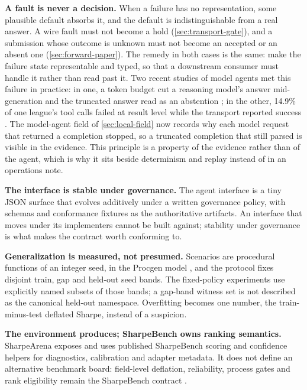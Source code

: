 \textbf{A fault is never a decision.} When a failure has no representation, some plausible default absorbs it, and the default is indistinguishable from a real answer. A wire fault must not become a hold (\cref{sec:transport-gate}), and a submission whose outcome is unknown must not become an accepted or an absent one (\cref{sec:forward-paper}). The remedy in both cases is the same: make the failure state representable and typed, so that a downstream consumer must handle it rather than read past it. Two recent studies of model agents met this failure in practice: in one, a token budget cut a reasoning model's answer mid-generation and the truncated answer read as an abstention \citep[p.~4]{barbieri2026auditing}; in the other, 14.9\% of one league's tool calls failed at result level while the transport reported success \citep[p.~14]{barton2026production}. The model-agent field of \cref{sec:local-field} now records why each model request that returned a completion stopped, so a truncated completion that still parsed is visible in the evidence. This principle is a property of the evidence rather than of the agent, which is why it sits beside determinism and replay instead of in an operations note.

\textbf{The interface is stable under governance.} The agent interface is a tiny JSON surface that evolves additively under a written governance policy, with schemas and conformance fixtures as the authoritative artifacts. An interface that moves under its implementers cannot be built against; stability under governance is what makes the contract worth conforming to.

\textbf{Generalization is measured, not presumed.} Scenarios are procedural functions of an integer seed, in the Procgen model \citep{cobbe2020procgen}, and the protocol fixes disjoint train, gap and held-out seed bands. The fixed-policy experiments use explicitly named subsets of those bands; a gap-band witness set is not described as the canonical held-out namespace. Overfitting becomes one number, the train-minus-test deflated Sharpe, instead of a suspicion.

\textbf{The environment produces; SharpeBench owns ranking semantics.} SharpeArena exposes and uses published SharpeBench scoring and confidence helpers for diagnostics, calibration and adapter metadata. It does not define an alternative benchmark board: field-level deflation, reliability, process gates and rank eligibility remain the SharpeBench contract \citep{toca2026sharpebench}.

